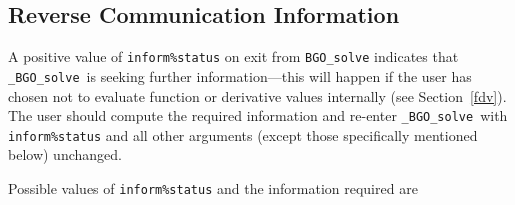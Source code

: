 \documentclass{galahad}
\newcommand{\packagename}{BGO}
\newcommand{\fullpackagename}{\libraryname\_\packagename}
\newcommand{\solver}{{\tt \fullpackagename\_solve}}
\begin{document}

\subsection{\label{reverse}Reverse Communication Information}

A positive value of {\tt inform\%status} on exit from
{\tt \packagename\_solve}
indicates that
\solver\ is seeking further information---this will happen
if the user has chosen not to evaluate function or
derivative values internally (see Section~\ref{fdv}).
The user should compute the required information and re-enter \solver\
with {\tt inform\%status} and all other arguments (except those specifically
mentioned below) unchanged.

Possible values of {\tt inform\%status} and the information required are
\end{document}
